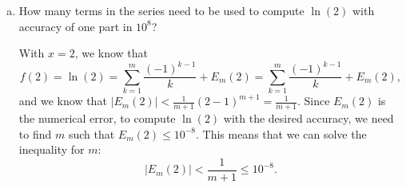 \documentclass[letterpaper]{article}
\begin{document}
\begin{mdframed}
\begin{enumerate}[(a)]
        \item How many terms in the series need to be used to compute $\ln(2)$ with accuracy of one part in $10^8$? 
        \begin{mdframed}
            With $x = 2$, we know that 
            \[f(2) = \ln(2) = \sum_{k = 1}^{m} \frac{(-1)^{k - 1}}{k} + E_{m}(2) = \sum_{k = 1}^{m} \frac{(-1)^{k - 1}}{k} + E_{m}(2),\]
            and we know that $|E_{m}(2)| < \frac{1}{m + 1}(2 - 1)^{m + 1} = \frac{1}{m + 1}$. Since $E_{m}(2)$ is the numerical error, to compute $\ln(2)$ with the desired accuracy, we need to find $m$ such that $E_{m}(2) \leq 10^{-8}$. This means that we can solve the inequality for $m$: 
            \[|E_{m}(2)| < \frac{1}{m + 1} \leq 10^{-8}.\] 
        \end{mdframed}
        
    \end{enumerate}
\end{mdframed}
\end{document}
